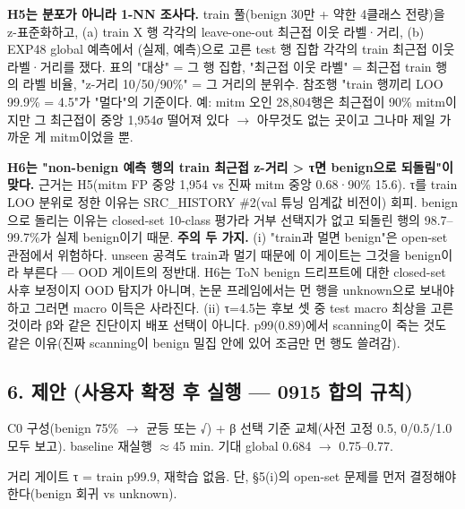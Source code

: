 \par\noindent \textbullet\enspace \textbf{H5는 분포가 아니라 1-NN 조사다.} train 풀(benign 30만 +\allowbreak{} 약한 4클래스 전량)을 z-표준화하고, (a) train X 행 각각의 leave-one-out 최근접 이웃 라벨·거리, (b) EXP48 global 예측에서 (실제, 예측)으로 고른 test 행 집합 각각의 train 최근접 이웃 라벨·거리를 쟀다. 표의 "대상" =\allowbreak{} 그 행 집합, "최근접 이웃 라벨" =\allowbreak{} 최근접 train 행의 라벨 비율, "z-거리 10/\allowbreak{}50/\allowbreak{}90\%" =\allowbreak{} 그 거리의 분위수. 참조행 "train 행끼리 LOO 99.9\% =\allowbreak{} 4.5"가 "멀다"의 기준이다. 예: mitm 오인 28,804행은 최근접이 90\% mitm이지만 그 최근접이 중앙 1,954σ 떨어져 있다  \ensuremath{\rightarrow}  아무것도 없는 곳이고 그나마 제일 가까운 게 mitm이었을 뿐.


\par\noindent \textbullet\enspace \textbf{H6는 "non-benign 예측 행의 train 최근접 z-거리 > τ면 benign으로 되돌림"이 맞다.} 근거는 H5(mitm FP 중앙 1,954 vs 진짜 mitm 중앙 0.68·90\% 15.6). τ를 train LOO 분위로 정한 이유는 SRC\_\allowbreak{}HISTORY \#2(val 튜닝 임계값 비전이) 회피. benign으로 돌리는 이유는 closed-set 10-class 평가라 거부 선택지가 없고 되돌린 행의 98.7–99.7\%가 실제 benign이기 때문. \textbf{주의 두 가지.} (i) "train과 멀면 benign"은 open-set 관점에서 위험하다. unseen 공격도 train과 멀기 때문에 이 게이트는 그것을 benign이라 부른다 — OOD 게이트의 정반대. H6는 ToN benign 드리프트에 대한 closed-set 사후 보정이지 OOD 탐지가 아니며, 논문 프레임에서는 먼 행을 unknown으로 보내야 하고 그러면 macro 이득은 사라진다. (ii) τ=\allowbreak{}4.5는 후보 셋 중 test macro 최상을 고른 것이라 β와 같은 진단이지 배포 선택이 아니다. p99(0.89)에서 scanning이 죽는 것도 같은 이유(진짜 scanning이 benign 밀집 안에 있어 조금만 먼 행도 쓸려감).


\subsection{6. 제안 (사용자 확정 후 실행 — 0915 합의 규칙)}
\par\noindent \textbullet\enspace C0 구성(benign 75\%  \ensuremath{\rightarrow}  균등 또는 √) +\allowbreak{} β 선택 기준 교체(사전 고정 0.5, 0/\allowbreak{}0.5/\allowbreak{}1.0 모두 보고). baseline 재실행 \ensuremath{\approx}45 min. 기대 global 0.684  \ensuremath{\rightarrow}  0.75–0.77.


\par\noindent \textbullet\enspace 거리 게이트 τ =\allowbreak{} train p99.9, 재학습 없음. 단, §5(i)의 open-set 문제를 먼저 결정해야 한다(benign 회귀 vs unknown).



